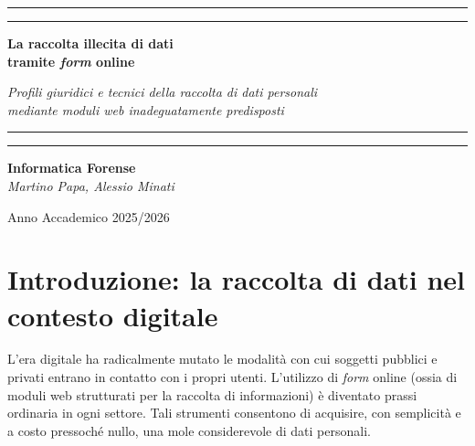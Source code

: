 \documentclass[12pt, a4paper]{article}
\begin{document}
\begin{titlepage}
  \centering
  \vspace*{1.5cm}

  {\color{legaleblue}\rule{\linewidth}{1.2pt}}\vspace{0.3cm}
  {\color{legaleblue}\rule{\linewidth}{0.4pt}}

  \vspace{0.8cm}
  {\Huge\bfseries\color{legaleblue}
    La raccolta illecita di dati\\[0.4em]
    tramite \emph{form} online\par}

  \vspace{0.5cm}
  {\large\itshape\color{legalegray}
    Profili giuridici e tecnici della raccolta di dati personali\\
    mediante moduli web inadeguatamente predisposti\par}

  \vspace{0.8cm}
  {\color{legaleblue}\rule{\linewidth}{0.4pt}}\vspace{0.3cm}
  {\color{legaleblue}\rule{\linewidth}{1.2pt}}

  \vfill

  {\normalsize\color{legalegray}
    \textbf{Informatica Forense}\\[1em]
    \textit{Martino Papa, Alessio Minati}}

  \vspace{1.5cm}

  {\small\color{legalegray} Anno Accademico 2025/2026}
\end{titlepage}

\thispagestyle{empty}
\newpage

\section{Introduzione: la raccolta di dati nel contesto digitale}
\label{sec:intro}

L'era digitale ha radicalmente mutato le modalità con cui soggetti pubblici e
privati entrano in contatto con i propri utenti. L'utilizzo di \emph{form} online 
(ossia di moduli web strutturati per la raccolta di informazioni) è diventato
prassi ordinaria in ogni settore. Tali strumenti consentono di acquisire, con
semplicità e a costo pressoché nullo, una mole considerevole di dati personali.
\end{document}
